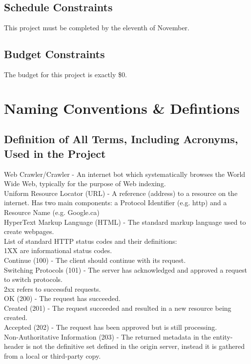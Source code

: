 \documentclass[titlepage]{article}
\begin{document}
\subsection*{Schedule Constraints}
This project must be completed by the eleventh of November.

\subsection*{Budget Constraints}
The budget for this project is exactly \$0.


\section{Naming Conventions \& Defintions}

\subsection*{Definition of All Terms, Including Acronyms, Used in the Project}
Web Crawler/Crawler - An internet bot which systematically browses the World Wide Web, typically for the purpose of Web indexing.
\\
Uniform Resource Locator (URL) - A reference (address) to a resource on the internet. Has two main components: a Protocol Identifier (e.g. http) and a Resource Name (e.g. Google.ca)
\\
HyperText Markup Language (HTML) - The standard markup language used to create webpages.
\\
List of standard HTTP status codes and their definitions:
\\
1XX are informational status codes.
\\
Continue (100) - The client should continue with its request.
\\
Switching Protocols (101) - The server has acknowledged and approved a request to switch protocols.
\\
2xx refers to successful requests.
\\
OK (200) - The request has succeeded.
\\
Created (201) - The request succeeded and resulted in a new resource being created.
\\
Accepted (202) - The request has been approved but is still processing.
\\
Non-Authoritative Information (203) - The returned metadata in the entity-header is not the definitive set defined in the origin server, instead it is gathered from a local or third-party copy.
\end{document}
